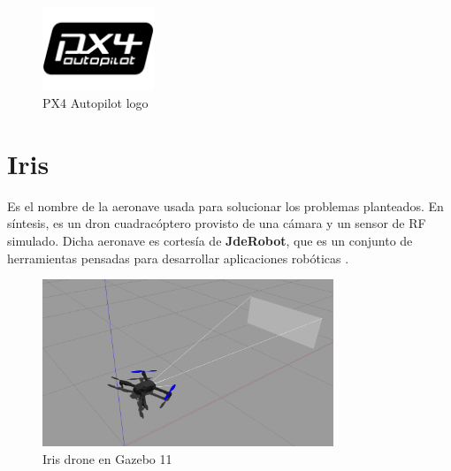 \begin{figure} [H]
	\begin{center}
	\includegraphics[height=2.5cm]{imagenes/cap3/7_px4_logo.png}
	\end{center}
	\caption[PX4 Autopilot logo]{PX4 Autopilot logo}
	\label{fig:px4autopilot}
\end{figure}

\section{Iris}
\label{sec:iris}

Es el nombre de la aeronave usada para solucionar los problemas planteados. En síntesis, es un dron cuadracóptero provisto de una cámara y un sensor de \ac{RF} simulado. Dicha aeronave es cortesía de \textbf{JdeRobot}, que es un conjunto de herramientas pensadas para desarrollar aplicaciones robóticas \cite{jderobot-ref}.\\

\begin{figure} [H]
	\begin{center}
	\includegraphics[height=5cm]{imagenes/cap3/8_iris_drone.png}
	\end{center}
	\caption[Iris drone en Gazebo 11]{Iris drone en Gazebo 11}
	\label{fig:irisdrone}
\end{figure}